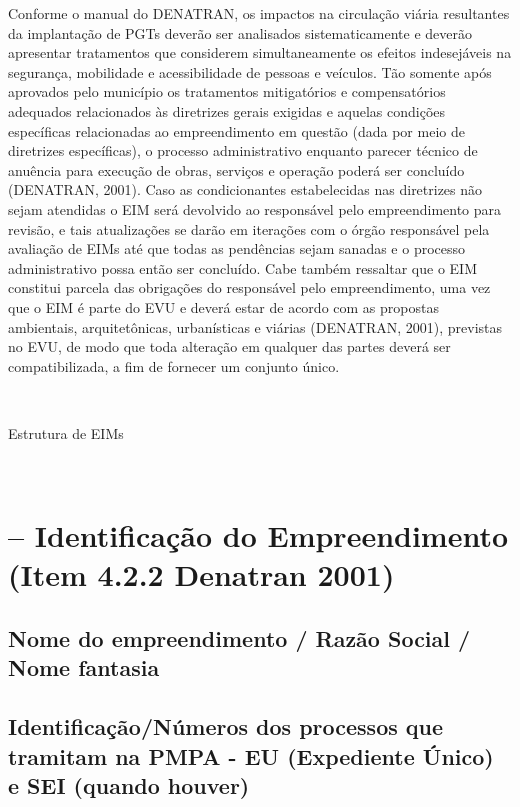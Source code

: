 \documentclass[]{article}
\begin{document}
Conforme o manual do DENATRAN, os impactos na circulação viária
resultantes da implantação de PGTs deverão ser analisados
sistematicamente e deverão apresentar tratamentos que considerem
simultaneamente os efeitos indesejáveis na segurança, mobilidade e
acessibilidade de pessoas e veículos. Tão somente após aprovados pelo
município os tratamentos mitigatórios e compensatórios adequados
relacionados às diretrizes gerais exigidas e aquelas condições
específicas relacionadas ao empreendimento em questão (dada por meio de
diretrizes específicas), o processo administrativo enquanto parecer
técnico de anuência para execução de obras, serviços e operação poderá
ser concluído (DENATRAN, 2001). Caso as condicionantes estabelecidas nas
diretrizes não sejam atendidas o EIM será devolvido ao responsável pelo
empreendimento para revisão, e tais atualizações se darão em iterações
com o órgão responsável pela avaliação de EIMs até que todas as
pendências sejam sanadas e o processo administrativo possa então ser
concluído. Cabe também ressaltar que o EIM constitui parcela das
obrigações do responsável pelo empreendimento, uma vez que o EIM é parte
do EVU e deverá estar de acordo com as propostas ambientais,
arquitetônicas, urbanísticas e viárias (DENATRAN, 2001), previstas no
EVU, de modo que toda alteração em qualquer das partes deverá ser
compatibilizada, a fim de fornecer um conjunto único.

~

{ Estrutura de EIMs}

~

\hypertarget{identificauxe7uxe3o-do-empreendimento-item-4.2.2-denatran-2001}{%
\section{-- Identificação do Empreendimento (Item 4.2.2 Denatran
2001)}\label{identificauxe7uxe3o-do-empreendimento-item-4.2.2-denatran-2001}}

\hypertarget{nome-do-empreendimento-razuxe3o-social-nome-fantasia}{%
\subsection{Nome do empreendimento / Razão Social / Nome
fantasia}\label{nome-do-empreendimento-razuxe3o-social-nome-fantasia}}

\hypertarget{identificauxe7uxe3onuxfameros-dos-processos-que-tramitam-na-pmpa---eu-expediente-uxfanico-e-sei-quando-houver}{%
\subsection{Identificação/Números dos processos que tramitam na PMPA -
EU (Expediente Único) e SEI (quando
houver)}\label{identificauxe7uxe3onuxfameros-dos-processos-que-tramitam-na-pmpa---eu-expediente-uxfanico-e-sei-quando-houver}}
\end{document}

